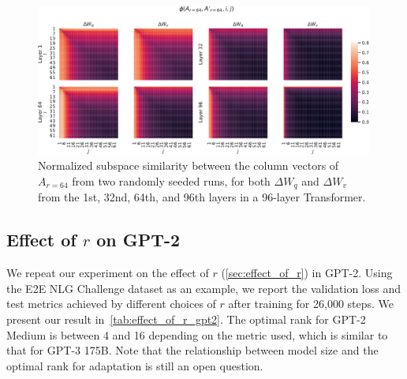 \documentclass{article} %
\begin{document}
\begin{figure}[h]
  \centering
    \includegraphics[width=0.99\textwidth]{figures/UA_across_random_seeds_more_layers.pdf}
    \caption{Normalized subspace similarity between the column vectors of $A_{r=64}$ from two randomly seeded runs, for both $\Delta W_q$ and $\Delta W_v$ from the 1st, 32nd, 64th, and 96th layers in a 96-layer Transformer.}
    \label{fig:UA_across_random_seeds_more_layers}
\end{figure}

\subsection{Effect of $r$ on GPT-2}
\label{app:gpt2_effect_r}

We repeat our experiment on the effect of $r$ (\autoref{sec:effect_of_r}) in GPT-2.
Using the E2E NLG Challenge dataset as an example, we report the validation loss and test metrics achieved by different choices of $r$ after training for 26,000 steps.
We present our result in~\autoref{tab:effect_of_r_gpt2}.
The optimal rank for GPT-2 Medium is between 4 and 16 depending on the metric used, which is similar to that for GPT-3 175B.
Note that the relationship between model size and the optimal rank for adaptation is still an open question.
\end{document}
